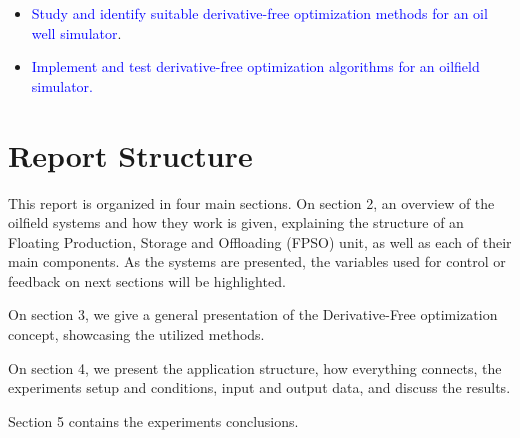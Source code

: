 \begin{itemize}
 \item \textcolor{blue}{Study and identify suitable derivative-free optimization methods for an oil well simulator}.
 
 \item \textcolor{blue}{Implement and test derivative-free optimization algorithms for an oilfield simulator.}
 
\end{itemize}


\section{Report Structure}

This report is organized in four main sections. On section 2, an overview of the oilfield systems and how they work is given, explaining the structure of an Floating Production, Storage and Offloading (FPSO) unit, as well as each of their main components. As the systems are presented, the variables used for control or feedback on next sections will be highlighted.

On section 3, we give a general presentation of the Derivative-Free optimization concept, showcasing the utilized methods. 

On section 4, we present the application structure, how everything connects, the experiments setup and conditions, input and output data, and discuss the results.

Section 5 contains the experiments conclusions.

 




